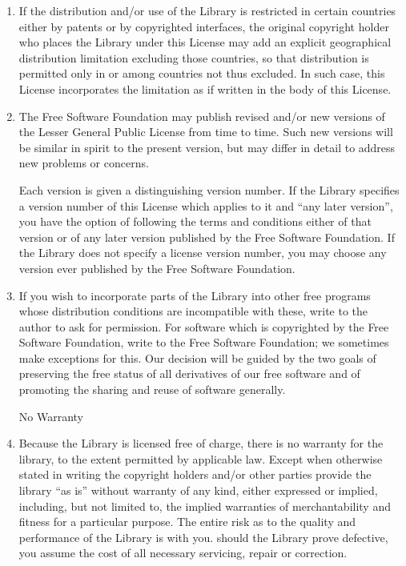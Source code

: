 \documentclass[12pt]{report}
\begin{document}
\begin{enumerate}
\pagebreak[4]


\item 

  If the distribution and/or use of the Library is restricted in certain
  countries either by patents or by copyrighted interfaces, the original
  copyright holder who places the Library under this License may add an
  explicit geographical distribution limitation excluding those countries,
  so that distribution is permitted only in or among countries not thus
  excluded.  In such case, this License incorporates the limitation as if
  written in the body of this License.

\item 

  The Free Software Foundation may publish revised and/or new versions of
  the Lesser General Public License from time to time.  Such new versions
  will be similar in spirit to the present version, but may differ in
  detail to address new problems or concerns.

  Each version is given a distinguishing version number.  If the Library
  specifies a version number of this License which applies to it and ``any
  later version'', you have the option of following the terms and
  conditions either of that version or of any later version published by
  the Free Software Foundation.  If the Library does not specify a license
  version number, you may choose any version ever published by the Free
  Software Foundation.


\item
  

  If you wish to incorporate parts of the Library into other free programs
  whose distribution conditions are incompatible with these, write to the
  author to ask for permission.  For software which is copyrighted by the
  Free Software Foundation, write to the Free Software Foundation; we
  sometimes make exceptions for this.  Our decision will be guided by the
  two goals of preserving the free status of all derivatives of our free
  software and of promoting the sharing and reuse of software generally.


\begin{center}
{\Large\sc
No Warranty
}
\end{center}

\item

{\sc Because the Library is licensed free of charge, there is no
warranty for the library, to the extent permitted by applicable law.
Except when otherwise stated in writing the copyright holders and/or
other parties provide the library ``as is'' without warranty of any
kind, either expressed or implied, including, but not limited to, the
implied warranties of merchantability and fitness for a particular
purpose.  The entire risk as to the quality and performance of the
Library is with you.  should the Library prove defective, you assume
the cost of all necessary servicing, repair or correction.}


\end{enumerate}
\end{document}
